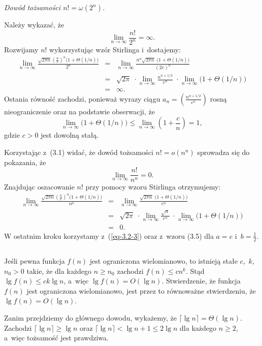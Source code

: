 \noindent\emph{Dowód tożsamości $n!=\omega(2^n)$.}

\noindent Należy wykazać, że
\[
	\lim_{n\to\infty}\frac{n!}{2^n} = \infty.
\]
Rozwijamy $n!$ wykorzystując wzór Stirlinga i~dostajemy:
\begin{eqnarray*}
	\lim_{n\to\infty}\frac{\sqrt{2\pi n}\left(\frac{n}{e}\right)^n\bigl(1+\Theta(1/n)\bigr)}{2^n} &=& \lim_{n\to\infty}\frac{n^n\sqrt{2\pi n}\;\bigl(1+\Theta(1/n)\bigr)}{(2e)^n} \\
	&=& \sqrt{2\pi}\;\cdot\lim_{n\to\infty}\frac{n^{n+1/2}}{e^n}\;\cdot\lim_{n\to\infty}\bigl(1+\Theta(1/n)\bigr) \\
	&=& \infty.
\end{eqnarray*}
Ostania równość zachodzi, ponieważ wyrazy ciągu $a_n=\left(\frac{n^{n+1/2}}{e^n}\right)$ rosną nieograniczenie oraz na podstawie obserwacji, że
\begin{equation}\label{eq-3.2-3}
  \lim_{n\to\infty}\bigl(1+\Theta(1/n)\bigr) \le \lim_{n\to\infty}\left(1+\frac{c}{n}\right) = 1,
\end{equation}
gdzie $c>0$ jest dowolną stałą.

Korzystając z~(3.1) widać, że dowód tożsamości $n!=o(n^n)$ sprowadza się do pokazania, że
\[
	\lim_{n\to\infty}\frac{n!}{n^n} = 0.
\]
Znajdując oszacowanie $n!$ przy pomocy wzoru Stirlinga otrzymujemy:
\begin{eqnarray*}
	\lim_{n\to\infty}\frac{\sqrt{2\pi n}\left(\frac{n}{e}\right)^n\bigl(1+\Theta(1/n)\bigr)}{n^n} &=& \lim_{n\to\infty}\frac{\sqrt{2\pi n}\;\bigl(1+\Theta(1/n)\bigr)}{e^n} \\
	&=& \sqrt{2\pi}\;\cdot\lim_{n\to\infty}\frac{\sqrt{n}}{e^n}\;\cdot\lim_{n\to\infty}\bigl(1+\Theta(1/n)\bigr) \\
	&=& 0.
\end{eqnarray*}
W ostatnim kroku korzystamy z~(\ref{eq-3.2-3}) oraz z~wzoru (3.5) dla $a=e$ i~$b=\frac{1}{2}$.

\subsection{} %
Jeśli pewna funkcja $f(n)$ jest ograniczona wielomianowo, to istnieją stałe $c$,~$k$,~$n_0>0$ takie, że dla każdego $n\ge n_0$ zachodzi $f(n)\le cn^k$. Stąd $\lg f(n)\le ck\lg n$, a~więc $\lg f(n)=O(\lg n)$. Stwierdzenie, że funkcja $f(n)$ jest ograniczona wielomianowo, jest przez to  równoważne stwierdzeniu, że $\lg f(n)=O(\lg n)$.

Zanim przejdziemy do głównego dowodu, wykażemy, że $\lceil\lg n\rceil=\Theta(\lg n)$. Zachodzi $\lceil\lg n\rceil\ge\lg n$ oraz $\lceil\lg n\rceil<\lg n+1\le2\lg n$ dla każdego $n\ge2$, a~więc tożsamość jest prawdziwa.


